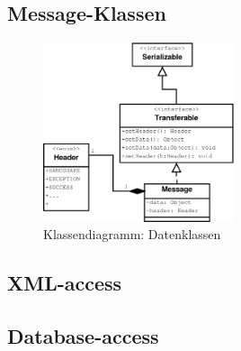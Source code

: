 \subsection{Message-Klassen}
\liable{\eddy}

\begin{figure}[H]
	\centering
	\label{dia:design:frontend:classes:msgcl}
	\includegraphics[width=0.5\textwidth]{design/frontend/classes/Message-Klassen.pdf}
	\caption{Klassendiagramm: Datenklassen}
\end{figure}

\subsection{XML-access}
\liable{\cii}
\subsection{Database-access}
\liable{\cii}

